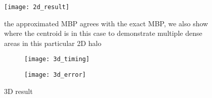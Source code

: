 \begin{figure}[ht]
\centering
    \texttt{[image: 2d\_result]}
    \caption{the approximated MBP agrees with the exact MBP, we also show where the centroid is in this case to demonstrate multiple dense areas in this particular 2D halo}
    \label{2d_result}
\end{figure}

\begin{figure}[ht]
\begin{subfigure}[b]{0.5\linewidth}
\texttt{[image: 3d\_timing]} 
\caption{\label{fig:timing}}
\end{subfigure}
\begin{subfigure}[b]{0.5\linewidth}
\texttt{[image: 3d\_error]}
\caption{\label{fig:error}}
\end{subfigure}
\caption{3D result}
\label{3dresult}
\end{figure}

